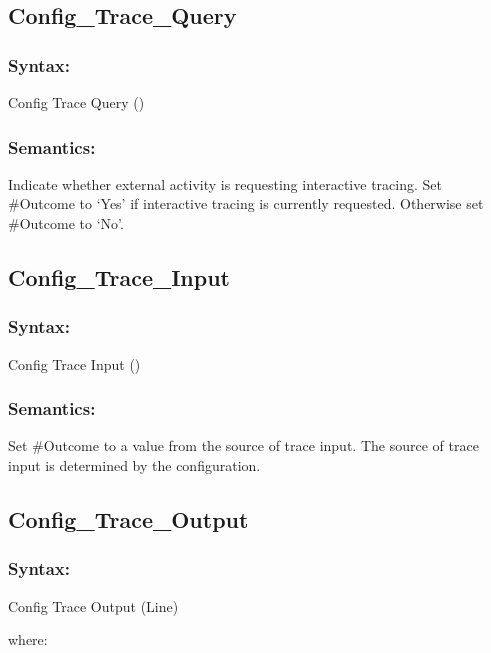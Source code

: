\subsection{Config\_Trace\_Query}\label{config_trace_query}

\subsubsection{Syntax:}\label{syntax-36}

Config Trace Query ()

\subsubsection{Semantics:}\label{semantics-37}

Indicate whether external activity is requesting interactive tracing.
Set \#Outcome to `Yes' if interactive tracing is currently requested.
Otherwise set \#Outcome to `No'.

\subsection{Config\_Trace\_Input}\label{config_trace_input}

\subsubsection{Syntax:}\label{syntax-37}

Config Trace Input ()

\subsubsection{Semantics:}\label{semantics-38}

Set \#Outcome to a value from the source of trace input. The source of
trace input is determined by the configuration.

\subsection{Config\_Trace\_Output}\label{config_trace_output}

\subsubsection{Syntax:}\label{syntax-38}

Config Trace Output (Line)

where:

